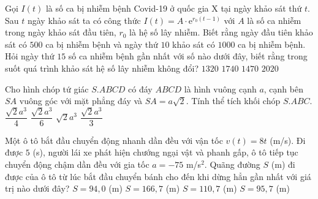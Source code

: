 \begin{ex}%
Gọi $I(t)$ là số ca bị nhiễm bệnh Covid-19 ở quốc gia X tại ngày khảo sát thứ $t$. Sau $t$ ngày khảo sát ta có công thức $I(t)=A \cdot\mathrm{e}^{r_0 (t-1)}$ với $A$ là số ca nhiễm trong ngày khảo sát đầu tiên, $r_0$ là hệ số lây nhiễm. Biết rằng ngày đầu tiên khảo sát có $500$ ca bị nhiễm bệnh và ngày thứ $10$ khảo sát có $1000$ ca bị nhiễm bệnh. Hỏi ngày thứ $15$ số ca nhiễm bệnh gần nhất với số nào dưới đây, biết rằng trong suốt quá trình khảo sát hệ số lây nhiễm không đổi? 
	\choice
	{ $1320$}
	{$1740$}
	{\True $1470$}
	{$2020$}
\end{ex}

\begin{ex}%
Cho hình chóp tứ giác $S.ABCD$ có đáy $ABCD$ là hình vuông cạnh $a$, cạnh bên $SA$ vuông góc với mặt phẳng đáy và $SA=a\sqrt{2}$. Tính thể tích khối chóp $S.ABC$. 
	\choice
	{ $\dfrac{\sqrt{2}a^3}{4}$}
	{\True $\dfrac{\sqrt{2}a^3}{6}$}
	{$\sqrt{2}a^3$}
	{$\dfrac{\sqrt{2}a^3}{3}$}
\end{ex}

\begin{ex}%
Một ô tô bắt đầu chuyển động nhanh dần đều với vận tốc $v(t)=8 t$ (m/s). Đi được $5$ (s), người lái xe phát hiện chướng ngại vật và phanh gấp, ô tô tiếp tục chuyển động chậm dần đều với gia tốc $a=-75$ m/s$^2$. Quãng đường $S$ (m) đi được của ô tô từ lúc bắt đầu chuyển bánh cho đến khi dừng hẳn gần nhất với giá trị nào dưới đây?
\choice
{$S=94{,}0$ (m)}
{$S=166{,}7$ (m)}
{\True $S=110{,}7$ (m)}
{$S=95{,}7$ (m)} 
\end{ex} 

